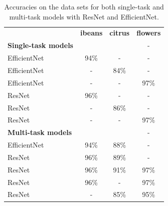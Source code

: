 \begin{table}[]
    \centering
    \begin{tabular}{lccl}
        \multicolumn{1}{l}{\textbf{}}    & \multicolumn{1}{l}{\textbf{ibeans}} & \multicolumn{1}{l}{\textbf{citrus}} & \multicolumn{1}{l}{\textbf{flowers}} \\ \cline{2-4}
        \textbf{Single-task models}      & \multicolumn{1}{l}{}                & \multicolumn{1}{l}{}                & \multicolumn{1}{c}{-}                \\ \hline
        \multicolumn{1}{l}{EfficientNet} & \multicolumn{1}{c}{94\%}            & \multicolumn{1}{c}{-}               & \multicolumn{1}{c}{-}                \\ \hline
        \multicolumn{1}{l}{EfficientNet} & \multicolumn{1}{c}{-}               & \multicolumn{1}{c}{84\%}            & \multicolumn{1}{c}{-}                \\ \hline
        \multicolumn{1}{l}{EfficientNet} & \multicolumn{1}{c}{-}               & \multicolumn{1}{c}{-}               & \multicolumn{1}{c}{97\%}             \\ \hline
        \multicolumn{1}{l}{ResNet}       & \multicolumn{1}{c}{96\%}            & \multicolumn{1}{c}{-}               & \multicolumn{1}{c}{-}                \\ \hline
        \multicolumn{1}{l}{ResNet}       & \multicolumn{1}{c}{-}               & \multicolumn{1}{c}{86\%}            & \multicolumn{1}{c}{-}                \\ \hline
        \multicolumn{1}{l}{ResNet}       & \multicolumn{1}{c}{-}               & \multicolumn{1}{c}{-}               & \multicolumn{1}{c}{97\%}             \\ \hline
        \textbf{Multi-task models}       & \multicolumn{1}{l}{}                & \multicolumn{1}{l}{}                & \multicolumn{1}{c}{-}                \\ \hline
        \multicolumn{1}{l}{EfficientNet} & \multicolumn{1}{c}{94\%}            & \multicolumn{1}{c}{88\%}            & \multicolumn{1}{c}{-}                \\ \hline
        \multicolumn{1}{l}{ResNet}       & \multicolumn{1}{c}{96\%}            & \multicolumn{1}{c}{89\%}            & \multicolumn{1}{c}{-}                \\ \hline
        \multicolumn{1}{l}{ResNet}       & \multicolumn{1}{c}{96\%}            & \multicolumn{1}{c}{91\%}            & \multicolumn{1}{c}{97\%}             \\ \hline
        \multicolumn{1}{l}{ResNet}       & \multicolumn{1}{c}{96\%}            & \multicolumn{1}{c}{-}               & \multicolumn{1}{c}{97\%}             \\ \hline
        \multicolumn{1}{l}{ResNet}       & \multicolumn{1}{c}{-}               & \multicolumn{1}{c}{85\%}            & \multicolumn{1}{c}{95\%}             \\ \hline
    \end{tabular}
    \caption{Accuracies on the data sets for both single-task and multi-task models with ResNet and EfficientNet.}
\end{table}

